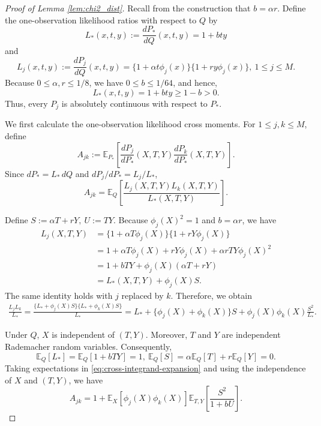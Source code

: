 \documentclass[10pt,a4paper]{amsart}
\begin{document}
\begin{proof}[Proof of Lemma \ref{lem:chi2_dist}]
Recall from the construction that \(b=\alpha r\).  Define the
one-observation likelihood ratios with respect to \(Q\) by
\[
L_*(x,t,y)
:=
\frac{dP_*}{dQ}(x,t,y)
=
1+bty
\]
and
\[
L_j(x,t,y)
:=
\frac{dP_j}{dQ}(x,t,y)
=
\{1+\alpha t\phi_j(x)\}
\{1+ry\phi_j(x)\},
\ 1\leq j\leq M.
\]
Because \(0\leq\alpha,r\leq1/8\), we have
\(0\leq b\leq1/64\), and hence,
\[
L_*(x,t,y)=1+bty\geq1-b>0.
\]
Thus, every \(P_j\) is absolutely continuous with respect to \(P_*\).

We first calculate the one-observation likelihood cross moments.  For
\(1\leq j,k\leq M\), define
\[
A_{jk}
:=
\mathbb E_{P_*}
\left[
\frac{dP_j}{dP_*}(X,T,Y)
\frac{dP_k}{dP_*}(X,T,Y)
\right].
\]
Since \(dP_*=L_*\,dQ\) and \(dP_j/dP_*=L_j/L_*\),
\begin{equation}
A_{jk}
=
\mathbb E_Q
\left[
\frac{L_j(X,T,Y)L_k(X,T,Y)}
     {L_*(X,T,Y)}
\right].
\label{eq:one-observation-cross-moment}
\end{equation}

Define $S:=\alpha T+rY,
\ 
U:=TY$. Because \(\phi_j(X)^2=1\) and \(b=\alpha r\), we have
\begin{align}
L_j(X,T,Y)
&=
\{1+\alpha T\phi_j(X)\}
\{1+rY\phi_j(X)\}
\nonumber\\
&=
1+\alpha T\phi_j(X)+rY\phi_j(X)
+\alpha rTY\phi_j(X)^2
\nonumber\\
&=
1+bTY+\phi_j(X)(\alpha T+rY)
\nonumber\\
&=
L_*(X,T,Y)+\phi_j(X)S.
\label{eq:likelihood-decomposition}
\end{align}
The same identity holds with \(j\) replaced by \(k\).  Therefore, we obtain
\begin{align}
\frac{L_jL_k}{L_*}
=
\frac{
\{L_*+\phi_j(X)S\}
\{L_*+\phi_k(X)S\}
}{L_*}
=
L_*
+\{\phi_j(X)+\phi_k(X)\}S
+\phi_j(X)\phi_k(X)\frac{S^2}{L_*}.
\label{eq:cross-integrand-expansion}
\end{align}

Under \(Q\), \(X\) is independent of \((T,Y)\).  Moreover, \(T\) and \(Y\)
are independent Rademacher random variables.  Consequently,
\[
\mathbb E_Q[L_*]
=
\mathbb E_Q[1+bTY]
=1,
\ 
\mathbb E_Q[S]
=
\alpha\mathbb E_Q[T]+r\mathbb E_Q[Y]
=0.
\]
Taking expectations in \eqref{eq:cross-integrand-expansion} and using the
independence of \(X\) and \((T,Y)\), we have
\begin{equation}
A_{jk}
=
1+
\mathbb E_X[\phi_j(X)\phi_k(X)]
\mathbb E_{T,Y}
\left[
\frac{S^2}{1+bU}
\right].
\label{eq:cross-moment-reduced}
\end{equation}


\end{proof}
\end{document}
